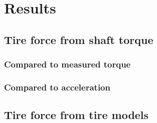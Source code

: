 \chapter{Results}



\section{Tire force from shaft torque}


\subsection{Compared to measured torque}


\subsection{Compared to acceleration}


\section{Tire force from tire models}
